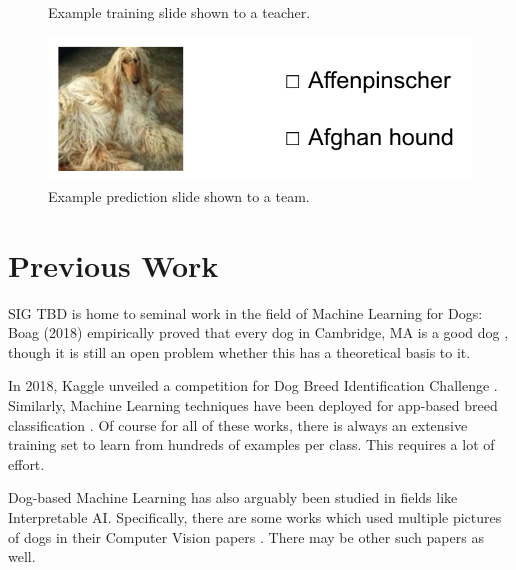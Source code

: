 \documentclass[sigplan,10pt]{acmart}
\begin{document}
\begin{figure}[!htb]
    \caption{Example training slide shown to a teacher.}
    \label{fig:example-train}
\endminipage\hfill
{}%
    \includegraphics[width=1.2\textwidth]{images/example-test.png}
    \caption{Example prediction slide shown to a team.}
    \label{fig:example-test}
\endminipage
\end{figure}

\section{Previous Work}
SIG TBD is home to seminal work in the field of Machine Learning for Dogs: Boag (2018) empirically proved that every dog in Cambridge, MA is a good dog \cite{good-dogs}, though it is still an open problem whether this has a theoretical basis to it.

In 2018, Kaggle unveiled a competition for Dog Breed Identification Challenge \cite{kaggle-breed-classification}. Similarly, Machine Learning techniques have been deployed for app-based breed classification \cite{ml-breed-classification}. Of course for all of these works, there is always an extensive training set to learn from hundreds of examples per class. This requires a lot of effort.

Dog-based Machine Learning has also arguably been studied in fields like Interpretable AI. Specifically, there are some works which used multiple pictures of dogs in their Computer Vision papers \cite{interpretable-dogs}. There may be other such papers as well.
\end{document}
